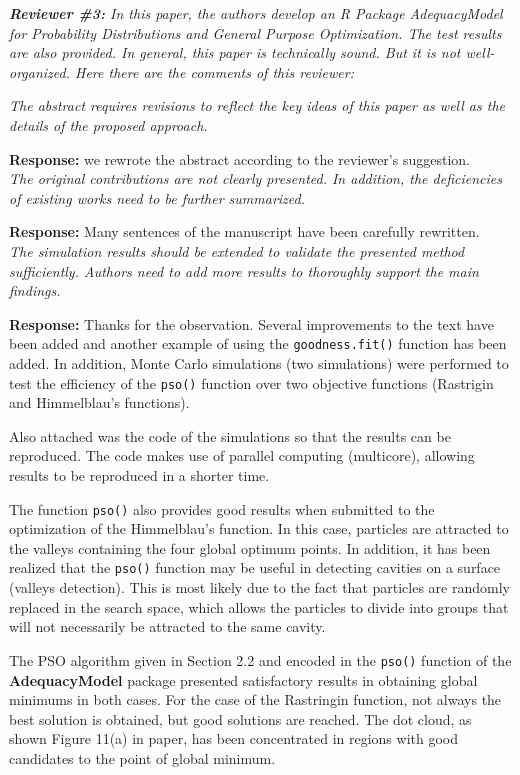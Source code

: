 \documentclass[a4paper,11pt]{exam}
\begin{document}
\noindent \textit{\textbf{Reviewer \#3:} In this paper, the authors develop an R Package AdequacyModel for Probability Distributions and General Purpose Optimization. The test results are also provided. In general, this paper is technically sound. But it is not well-organized. Here there are the comments of this reviewer:}
\begin{questions}
\question \textit{The abstract requires revisions to reflect the key ideas of this paper as well as the details of the proposed approach.}

\noindent \textbf{Response:} we rewrote the abstract according to the reviewer's suggestion.\\

\question \textit{The original contributions are not clearly presented. In addition, the deficiencies of existing works need to be further summarized.}

\noindent \textbf{Response:} Many sentences of the manuscript have been carefully rewritten.\\ 

\question \textit{The simulation results should be extended to validate the presented method sufficiently. Authors need to add more results to thoroughly support the main findings.}

\noindent \textbf{Response:} Thanks for the observation. Several improvements to the text have been added and another example of using the \texttt{goodness.fit()} function has been added. In addition, Monte Carlo simulations (two simulations) were performed to test the efficiency of the \texttt{pso()} function over two objective functions (Rastrigin and Himmelblau's functions).

Also attached was the code of the simulations so that the results can be reproduced. The code makes use of parallel computing (multicore), allowing results to be reproduced in a shorter time.  

The function \texttt{pso()} also provides good results when submitted to the optimization of the Himmelblau's function. In this case, particles are attracted to the valleys containing the four global optimum points. In addition, it has been realized that the \texttt{pso()} function may be useful in detecting cavities on a surface (valleys detection). This is most likely due to the fact that particles are randomly replaced in the search space, which allows the particles to divide into groups that will not necessarily be attracted to the same cavity.

The PSO algorithm given in Section 2.2 and encoded in the \texttt{pso()} function of the \textbf{AdequacyModel} package presented satisfactory results in obtaining global minimums in both cases. For the case of the Rastringin function, not always the best solution is obtained, but good solutions are reached. The dot cloud, as shown Figure 11(a) in paper, has been concentrated in regions with good candidates to the point of global minimum.


\end{questions}
\end{document}
